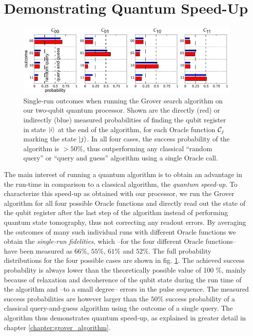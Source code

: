 \section{Demonstrating Quantum Speed-Up}

%
\begin{figure}[ht!]
 \centering \includegraphics[width=1\textwidth]{"./data/ct5/2011_04_21 - grover and tomo/good_data/grover algorithm - single run probabilities"}
\caption[Single-run results of the Grover search algorithm]{Single-run outcomes when running the Grover search algorithm on our two-qubit quantum processor. Shown are the directly (red) or indirectly (blue) measured probabilities of finding the qubit register in state $\left| i \right>$ at the end of the algorithm, for each Oracle function $\Or_j$ marking the state $\left| j \right>$. In all four cases, the success probability of the algorithm is $>50\%$, thus outperforming any classical ``random query'' or ``query and guess''
algorithm using a single Oracle call.}


\label{fig:grover_single_shot_probabilities} %
\end{figure}


The main interest of running a quantum algorithm is to obtain an advantage
in the run-time in comparison to a classical algorithm, the
\textit{quantum speed-up}. To characterize this speed-up as obtained
with our processor, we run the Grover algorithm for all four possible
Oracle functions and directly read out the state of the qubit register
after the last step of the algorithm instead of performing quantum
state tomography, thus not correcting any readout errors. By averaging
the outcomes of many such individual runs with different
Oracle functions we obtain the \textit{single-run fidelities},
which --for the four different Oracle functions-- have been measured
as $66\%$, $55\%$, $61\%$ and $52\%$. The full probability distributions
for the four possible cases are shown in fig.
\ref{fig:grover_single_shot_probabilities}. The achieved success
probability is always lower than the theoretically possible value
of 100 \%, mainly because of relaxation and decoherence of the qubit
state during the run time of the algorithm and --to a small degree-- errors in the
pulse sequence. The measured success probabilities
are however larger than the $50\%$ success probability of a classical
query-and-guess algorithm using the outcome of a single query. The algorithm thus
demonstrates quantum speed-up, as
explained in greater detail in chapter \ref{chapter:grover_algorithm}. 

